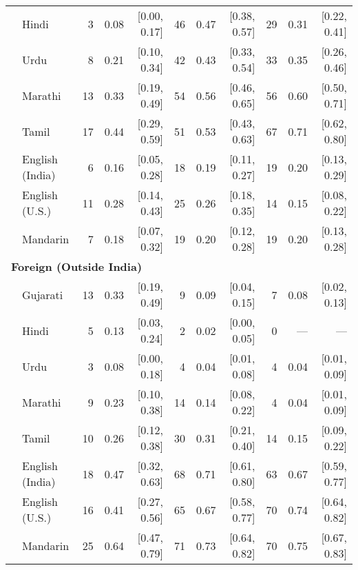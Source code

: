 \begin{table}[t]
\begin{footnotesize}
\begin{tabular}{p{.1in}lrrrrrrrrr}
 & Hindi & 3 & 0.08 & [0.00, 0.17] & 46 & 0.47 & [0.38, 0.57] & 29 & 0.31 & [0.22, 0.41]\\

 & Urdu & 8 & 0.21 & [0.10, 0.34] & 42 & 0.43 & [0.33, 0.54] & 33 & 0.35 & [0.26, 0.46]\\

 & Marathi & 13 & 0.33 & [0.19, 0.49] & 54 & 0.56 & [0.46, 0.65] & 56 & 0.60 & [0.50, 0.71]\\

 & Tamil & 17 & 0.44 & [0.29, 0.59] & 51 & 0.53 & [0.43, 0.63] & 67 & 0.71 & [0.62, 0.80]\\

 & English (India) & 6 & 0.16 & [0.05, 0.28] & 18 & 0.19 & [0.11, 0.27] & 19 & 0.20 & [0.13, 0.29]\\

 & English (U.S.) & 11 & 0.28 & [0.14, 0.43] & 25 & 0.26 & [0.18, 0.35] & 14 & 0.15 & [0.08, 0.22]\\

& Mandarin & 7 & 0.18 & [0.07, 0.32] & 19 & 0.20 & [0.12, 0.28] & 19 & 0.20 & [0.13, 0.28]\\

\midrule
\multicolumn{11}{l}{\textbf{Foreign (Outside India)}}\\
& Gujarati & 13 & 0.33 & [0.19, 0.49] & 9 & 0.09 & [0.04, 0.15] & 7 & 0.08 & [0.02, 0.13]\\

 & Hindi & 5 & 0.13 & [0.03, 0.24] & 2 & 0.02 & [0.00, 0.05] & 0 & --- & ---\\

 & Urdu & 3 & 0.08 & [0.00, 0.18] & 4 & 0.04 & [0.01, 0.08] & 4 & 0.04 & [0.01, 0.09]\\

 & Marathi & 9 & 0.23 & [0.10, 0.38] & 14 & 0.14 & [0.08, 0.22] & 4 & 0.04 & [0.01, 0.09]\\

 & Tamil & 10 & 0.26 & [0.12, 0.38] & 30 & 0.31 & [0.21, 0.40] & 14 & 0.15 & [0.09, 0.22]\\

 & English (India) & 18 & 0.47 & [0.32, 0.63] & 68 & 0.71 & [0.61, 0.80] & 63 & 0.67 & [0.59, 0.77]\\

 & English (U.S.) & 16 & 0.41 & [0.27, 0.56] & 65 & 0.67 & [0.58, 0.77] & 70 & 0.74 & [0.64, 0.82]\\

& Mandarin & 25 & 0.64 & [0.47, 0.79] & 71 & 0.73 & [0.64, 0.82] & 70 & 0.75 & [0.67, 0.83]\\


\end{tabular}
\end{footnotesize}
\end{table}
